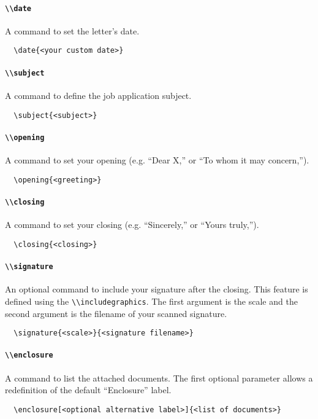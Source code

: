 \documentclass[a4paper, 11pt]{article}
\newcommand{\code}[1]{\lstinline!#1!}
\begin{document}
\paragraph{\code{\\date}}
A command to set the letter's date.
\begin{lstlisting}
  \date{<your custom date>}
\end{lstlisting}

\paragraph{\code{\\subject}}
A command to define the job application subject.
\begin{lstlisting}
  \subject{<subject>}
\end{lstlisting}

\paragraph{\code{\\opening}}
A command to set your opening (e.g. ``Dear X,'' or ``To whom it may concern,'').
\begin{lstlisting}
  \opening{<greeting>}
\end{lstlisting}

\paragraph{\code{\\closing}}
A command to set your closing (e.g. ``Sincerely,'' or ``Yours truly,'').
\begin{lstlisting}
  \closing{<closing>}
\end{lstlisting}

\paragraph{\code{\\signature}}
An optional command to include your signature after the closing. This feature is defined using the \code{\\includegraphics}. The first argument is the scale and the second argument is the filename of your scanned signature.
\begin{lstlisting}
  \signature{<scale>}{<signature filename>}
\end{lstlisting}

\paragraph{\code{\\enclosure}}
A command to list the attached documents. The first optional parameter allows a redefinition of the default ``Enclosure'' label.
\begin{lstlisting}
  \enclosure[<optional alternative label>]{<list of documents>}
\end{lstlisting}
\end{document}
